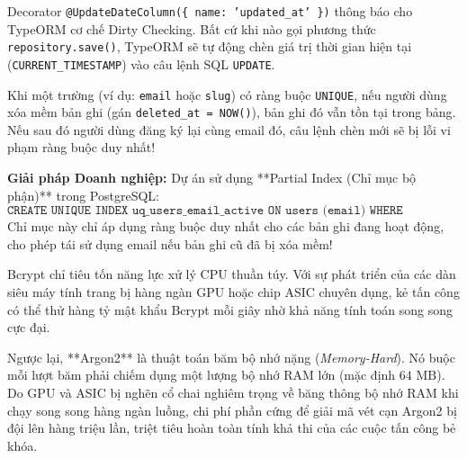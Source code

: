 \documentclass[12pt,a4paper,oneside]{book}
\begin{document}
\begin{qnabox}
  Decorator \texttt{@UpdateDateColumn(\{ name: 'updated\_at' \})} thông báo cho TypeORM cơ chế Dirty Checking. Bất cứ khi nào gọi phương thức \texttt{repository.save()}, TypeORM sẽ tự động chèn giá trị thời gian hiện tại (\texttt{CURRENT\_TIMESTAMP}) vào câu lệnh SQL \texttt{UPDATE}.
\end{qnabox}

\begin{qnabox}
  Khi một trường (ví dụ: \texttt{email} hoặc \texttt{slug}) có ràng buộc \texttt{UNIQUE}, nếu người dùng xóa mềm bản ghi (gán \texttt{deleted\_at = NOW()}), bản ghi đó vẫn tồn tại trong bảng. Nếu sau đó người dùng đăng ký lại cùng email đó, câu lệnh chèn mới sẽ bị lỗi vi phạm ràng buộc duy nhất!
  
  \textbf{Giải pháp Doanh nghiệp:} Dự án sử dụng **Partial Index (Chỉ mục bộ phận)** trong PostgreSQL:
  \begin{equation}
    \texttt{CREATE UNIQUE INDEX uq\_users\_email\_active ON users (email) WHERE deleted\_at IS NULL;}
  \end{equation}
  Chỉ mục này chỉ áp dụng ràng buộc duy nhất cho các bản ghi đang hoạt động, cho phép tái sử dụng email nếu bản ghi cũ đã bị xóa mềm!
\end{qnabox}

\begin{qnabox}
  Bcrypt chỉ tiêu tốn năng lực xử lý CPU thuần túy. Với sự phát triển của các dàn siêu máy tính trang bị hàng ngàn GPU hoặc chip ASIC chuyên dụng, kẻ tấn công có thể thử hàng tỷ mật khẩu Bcrypt mỗi giây nhờ khả năng tính toán song song cực đại.
  
  Ngược lại, **Argon2** là thuật toán băm bộ nhớ nặng (\textit{Memory-Hard}). Nó buộc mỗi lượt băm phải chiếm dụng một lượng bộ nhớ RAM lớn (mặc định $64\text{ MB}$). Do GPU và ASIC bị nghẽn cổ chai nghiêm trọng về băng thông bộ nhớ RAM khi chạy song song hàng ngàn luồng, chi phí phần cứng để giải mã vét cạn Argon2 bị đội lên hàng triệu lần, triệt tiêu hoàn toàn tính khả thi của các cuộc tấn công bẻ khóa.
\end{qnabox}
\end{document}

